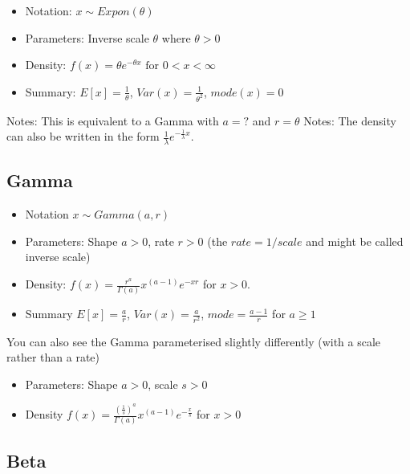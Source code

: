 \documentclass{article}
\begin{document}
\begin{itemize}
\item[] Notation: $x \sim Expon(\theta)$

\item[] Parameters: Inverse scale $\theta$ where $\theta>0$

\item[] Density: $f(x)=\theta e^{-\theta x} \mbox{ for } 0 < x < \infty$

\item[] Summary: $E[x]=\frac{1}{\theta}$, $Var(x)=\frac{1}{\theta^2}$, $mode(x)=0$
\end{itemize}

Notes: This is equivalent to a Gamma with $a=?$ and $r=\theta$
Notes: The density can also be written in the form $\frac{1}{\lambda}e^{-\frac{1}{\lambda} x}$.



\subsection{Gamma}

\begin{itemize}
\item[] Notation $x \sim Gamma(a,r)$

\item[] Parameters: Shape $a>0$, rate $r>0$ (the $rate = 1/scale$ and might be called inverse scale)

\item[] Density: $f(x)=\frac{r^{a}}{\Gamma(a)}x^{(a-1)}e^{-xr}$ for $x>0$.

\item[] Summary $E[x]=\frac{a}{r}$, $Var(x)=\frac{a}{r^2}$, $mode=\frac{a-1}{r}$ for $a \geq 1$
\end{itemize}

You can also see the Gamma parameterised slightly differently (with a scale rather than a rate)

\begin{itemize}

\item[] Parameters: Shape $a>0$, scale $s>0$

\item[] Density $f(x)=\frac{(\frac{1}{s})^{a}}{\Gamma(a)}x^{(a-1)}e^{-\frac{x}{s}}$  for $x>0$

\end{itemize}



\subsection{Beta}
\end{document}
